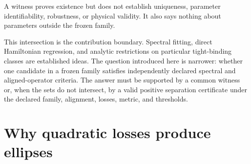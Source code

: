 A witness proves existence but does not establish uniqueness, parameter
identifiability, robustness, or physical validity. It also says nothing about
parameters outside the frozen family.

This intersection is the contribution boundary. Spectral fitting, direct
Hamiltonian regression, and analytic restrictions on particular tight-binding
classes are established ideas. The question introduced here is narrower:
whether one candidate in a frozen family satisfies independently declared
spectral and aligned-operator criteria. The answer must be supported by a
common witness or, when the sets do not intersect, by a valid positive
separation certificate under the declared family, alignment, losses, metric,
and thresholds.

\section{Why quadratic losses produce ellipses}

